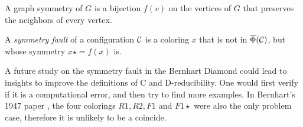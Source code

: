 \begin{definition}
    A graph symmetry of $G$ is a bijection $f(v)$ on the vertices of $G$ that preserves the neighbors of every vertex.
\end{definition}

\begin{definition}
    A \emph{symmetry fault} of a configuration $\mathcal{C}$ is a coloring $x$ that is not in $\overline{\Phi}(\mathcal{C})$, but whose symmetry $x\star = f(x)$ is.
\end{definition}

A future study on the symmetry fault in the Bernhart Diamond could lead to insights to improve the definitions of C and D-reducibility. One would first verify if it is a computational error, and then try to find more examples. In Bernhart's 1947 paper \cite{bernhart}, the four colorings $R1, R2, F1$ and $F1\star$ were also the only problem case, therefore it is unlikely to be a coincide.

